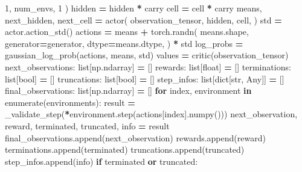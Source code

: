 \documentclass[
  chinese,
  11pt,
  letterpaper,
]{article}
\newenvironment{Shaded}{\begin{snugshade}}{\end{snugshade}}
\newcommand{\BuiltInTok}[1]{#1}
\newcommand{\ControlFlowTok}[1]{\textcolor[rgb]{0.13,0.29,0.53}{\textbf{#1}}}
\newcommand{\DecValTok}[1]{\textcolor[rgb]{0.00,0.00,0.81}{#1}}
\newcommand{\KeywordTok}[1]{\textcolor[rgb]{0.13,0.29,0.53}{\textbf{#1}}}
\newcommand{\NormalTok}[1]{#1}
\newcommand{\OperatorTok}[1]{\textcolor[rgb]{0.81,0.36,0.00}{\textbf{#1}}}
\renewenvironment{Shaded}{\par\smallskip}{\par\smallskip}
\begin{document}
\begin{Shaded}
\begin{Highlighting}[]
                \DecValTok{1}\NormalTok{, num\_envs, }\DecValTok{1}
\NormalTok{            )}
\NormalTok{            hidden }\OperatorTok{=}\NormalTok{ hidden }\OperatorTok{*}\NormalTok{ carry}
\NormalTok{            cell }\OperatorTok{=}\NormalTok{ cell }\OperatorTok{*}\NormalTok{ carry}
\NormalTok{            means, next\_hidden, next\_cell }\OperatorTok{=}\NormalTok{ actor(}
\NormalTok{                observation\_tensor,}
\NormalTok{                hidden,}
\NormalTok{                cell,}
\NormalTok{            )}
\NormalTok{            std }\OperatorTok{=}\NormalTok{ actor.action\_std()}
\NormalTok{            actions }\OperatorTok{=}\NormalTok{ means }\OperatorTok{+}\NormalTok{ torch.randn(}
\NormalTok{                means.shape,}
\NormalTok{                generator}\OperatorTok{=}\NormalTok{generator,}
\NormalTok{                dtype}\OperatorTok{=}\NormalTok{means.dtype,}
\NormalTok{            ) }\OperatorTok{*}\NormalTok{ std}
\NormalTok{            log\_probs }\OperatorTok{=}\NormalTok{ gaussian\_log\_prob(actions, means, std)}
\NormalTok{            values }\OperatorTok{=}\NormalTok{ critic(observation\_tensor)}
\NormalTok{        next\_observations: }\BuiltInTok{list}\NormalTok{[np.ndarray] }\OperatorTok{=}\NormalTok{ []}
\NormalTok{        rewards: }\BuiltInTok{list}\NormalTok{[}\BuiltInTok{float}\NormalTok{] }\OperatorTok{=}\NormalTok{ []}
\NormalTok{        terminations: }\BuiltInTok{list}\NormalTok{[}\BuiltInTok{bool}\NormalTok{] }\OperatorTok{=}\NormalTok{ []}
\NormalTok{        truncations: }\BuiltInTok{list}\NormalTok{[}\BuiltInTok{bool}\NormalTok{] }\OperatorTok{=}\NormalTok{ []}
\NormalTok{        step\_infos: }\BuiltInTok{list}\NormalTok{[}\BuiltInTok{dict}\NormalTok{[}\BuiltInTok{str}\NormalTok{, Any]] }\OperatorTok{=}\NormalTok{ []}
\NormalTok{        final\_observations: }\BuiltInTok{list}\NormalTok{[np.ndarray] }\OperatorTok{=}\NormalTok{ []}
        \ControlFlowTok{for}\NormalTok{ index, environment }\KeywordTok{in} \BuiltInTok{enumerate}\NormalTok{(environments):}
\NormalTok{            result }\OperatorTok{=}\NormalTok{ \_validate\_step(}\OperatorTok{*}\NormalTok{environment.step(actions[index].numpy()))}
\NormalTok{            next\_observation, reward, terminated, truncated, info }\OperatorTok{=}\NormalTok{ result}
\NormalTok{            final\_observations.append(next\_observation)}
\NormalTok{            rewards.append(reward)}
\NormalTok{            terminations.append(terminated)}
\NormalTok{            truncations.append(truncated)}
\NormalTok{            step\_infos.append(info)}
            \ControlFlowTok{if}\NormalTok{ terminated }\KeywordTok{or}\NormalTok{ truncated:}

\end{Highlighting}
\end{Shaded}
\end{document}
